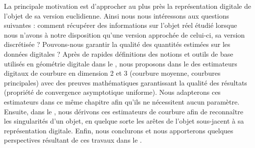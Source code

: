 La principale motivation est d'approcher au plus près la représentation digitale
de l'objet de sa version euclidienne. Ainsi nous nous intéressons aux questions
suivantes : comment récupérer des informations sur l'objet réel étudié lorsque
nous n'avons à notre disposition qu'une version approchée de celui-ci, sa
version discrétisée ? Pouvons-nous garantir la qualité des quantités estimées
sur les données digitales ? Après de rapides définitions des notions et outils
de base utilisés en géométrie digitale dans le , nous
proposons dans le  des estimateurs digitaux de
courbure en dimension 2 et 3 (courbure moyenne, courbures principales) avec des
preuves mathématiques garantissant la qualité des résultats (propriété de
convergence asymptotique uniforme). Nous adapterons ces estimateurs dans ce même
chapitre afin qu'ils ne nécessitent aucun paramètre. Ensuite, dans le
, nous dérivons ces estimateurs de courbure afin
de reconnaître les singularités d'un objet, en quelque sorte les arêtes de
l'objet sous-jacent à sa représentation digitale. Enfin, nous conclurons et nous
apporterons quelques perspectives résultant de ces travaux dans le
.
%
%
%
%
%
%
%

